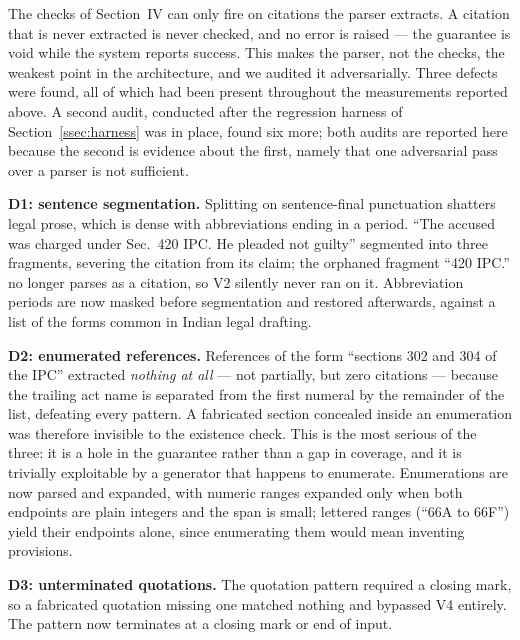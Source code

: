 \documentclass[conference]{IEEEtran}
\begin{document}
The checks of Section~IV can only fire on citations the parser extracts. A
citation that is never extracted is never checked, and no error is raised ---
the guarantee is void while the system reports success. This makes the parser,
not the checks, the weakest point in the architecture, and we audited it
adversarially. Three defects were found, all of which had been present
throughout the measurements reported above. A second audit, conducted after
the regression harness of Section~\ref{ssec:harness} was in place, found six
more; both audits are reported here because the second is evidence about the
first, namely that one adversarial pass over a parser is not sufficient.

\textbf{D1: sentence segmentation.} Splitting on sentence-final punctuation
shatters legal prose, which is dense with abbreviations ending in a period.
``The accused was charged under Sec.~420 IPC. He pleaded not guilty''
segmented into three fragments, severing the citation from its claim; the
orphaned fragment ``420 IPC.'' no longer parses as a citation, so V2 silently
never ran on it. Abbreviation periods are now masked before segmentation and
restored afterwards, against a list of the forms common in Indian legal
drafting.

\textbf{D2: enumerated references.} References of the form ``sections 302 and
304 of the IPC'' extracted \emph{nothing at all} --- not partially, but zero
citations --- because the trailing act name is separated from the first numeral
by the remainder of the list, defeating every pattern. A fabricated section
concealed inside an enumeration was therefore invisible to the existence check.
This is the most serious of the three: it is a hole in the guarantee rather
than a gap in coverage, and it is trivially exploitable by a generator that
happens to enumerate. Enumerations are now parsed and expanded, with numeric
ranges expanded only when both endpoints are plain integers and the span is
small; lettered ranges (``66A to 66F'') yield their endpoints alone, since
enumerating them would mean inventing provisions.

\textbf{D3: unterminated quotations.} The quotation pattern required a closing
mark, so a fabricated quotation missing one matched nothing and bypassed V4
entirely. The pattern now terminates at a closing mark or end of input.
\end{document}
